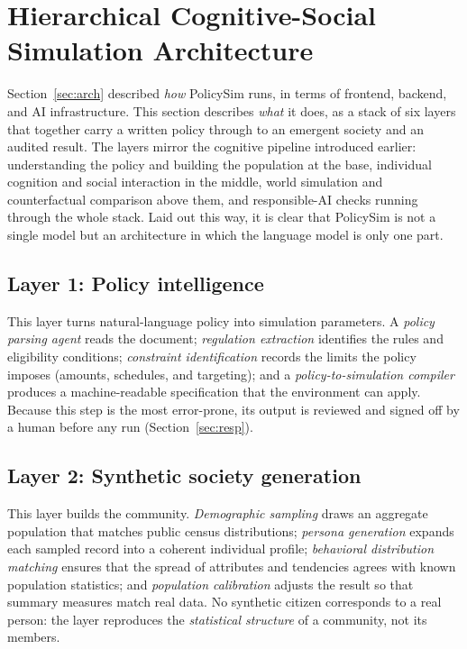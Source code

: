 \documentclass[conference]{IEEEtran}
\begin{document}
\section{Hierarchical Cognitive-Social Simulation Architecture}
\label{sec:layers}

Section~\ref{sec:arch} described \emph{how} PolicySim runs, in terms of frontend, backend, and AI infrastructure. This section describes \emph{what} it does, as a stack of six layers that together carry a written policy through to an emergent society and an audited result. The layers mirror the cognitive pipeline introduced earlier: understanding the policy and building the population at the base, individual cognition and social interaction in the middle, world simulation and counterfactual comparison above them, and responsible-AI checks running through the whole stack. Laid out this way, it is clear that PolicySim is not a single model but an architecture in which the language model is only one part.

\subsection{Layer 1: Policy intelligence}
This layer turns natural-language policy into simulation parameters. A \emph{policy parsing agent} reads the document; \emph{regulation extraction} identifies the rules and eligibility conditions; \emph{constraint identification} records the limits the policy imposes (amounts, schedules, and targeting); and a \emph{policy-to-simulation compiler} produces a machine-readable specification that the environment can apply. Because this step is the most error-prone, its output is reviewed and signed off by a human before any run (Section~\ref{sec:resp}).

\subsection{Layer 2: Synthetic society generation}
This layer builds the community. \emph{Demographic sampling} draws an aggregate population that matches public census distributions; \emph{persona generation} expands each sampled record into a coherent individual profile; \emph{behavioral distribution matching} ensures that the spread of attributes and tendencies agrees with known population statistics; and \emph{population calibration} adjusts the result so that summary measures match real data. No synthetic citizen corresponds to a real person: the layer reproduces the \emph{statistical structure} of a community, not its members.
\end{document}

